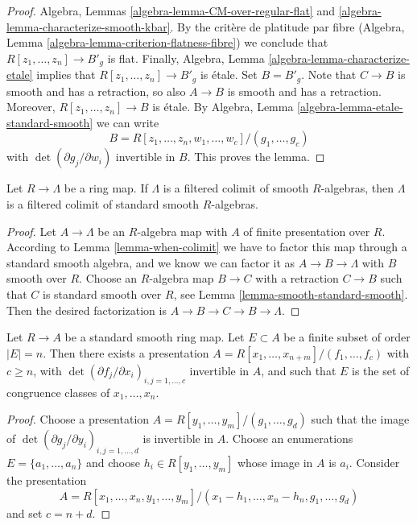 \begin{proof}
Algebra, Lemmas \ref{algebra-lemma-CM-over-regular-flat} and
\ref{algebra-lemma-characterize-smooth-kbar}. By the crit\`ere
de platitude par fibre
(Algebra, Lemma \ref{algebra-lemma-criterion-flatness-fibre})
we conclude that $R[z_1, \ldots, z_n] \to B'_g$ is flat.
Finally, Algebra, Lemma \ref{algebra-lemma-characterize-etale}
implies that $R[z_1, \ldots, z_n] \to B'_g$ is \'etale.
Set $B = B'_g$. Note that $C \to B$ is smooth and has a retraction,
so also $A \to B$ is smooth and has a retraction.
Moreover, $R[z_1, \ldots, z_n] \to B$ is \'etale.
By Algebra, Lemma \ref{algebra-lemma-etale-standard-smooth}
we can write
$$
B = R[z_1, \ldots, z_n, w_1, \ldots, w_c]/(g_1, \ldots, g_c)
$$
with $\det(\partial g_j/\partial w_i)$ invertible in $B$.
This proves the lemma.
\end{proof}

\begin{lemma}
\label{lemma-colimit-standard-smooth}
Let $R \to \Lambda$ be a ring map. If $\Lambda$ is a filtered colimit of
smooth $R$-algebras, then $\Lambda$ is a filtered colimit of standard
smooth $R$-algebras.
\end{lemma}

\begin{proof}
Let $A \to \Lambda$ be an $R$-algebra map with $A$
of finite presentation over $R$. According to
Lemma \ref{lemma-when-colimit}
we have to factor this map through a standard smooth algebra, and
we know we can factor it as $A \to B \to \Lambda$ with $B$ smooth
over $R$. Choose an $R$-algebra map $B \to C$ with a retraction
$C \to B$ such that $C$ is standard smooth over $R$, see
Lemma \ref{lemma-smooth-standard-smooth}.
Then the desired factorization is $A \to B \to C \to B \to \Lambda$.
\end{proof}

\begin{lemma}
\label{lemma-standard-smooth-include-generators}
Let $R \to A$ be a standard smooth ring map.
Let $E \subset A$ be a finite subset of order $|E| = n$.
Then there exists a presentation
$A = R[x_1, \ldots, x_{n + m}]/(f_1, \ldots, f_c)$ with $c \geq n$,
with $\det(\partial f_j/\partial x_i)_{i, j = 1, \ldots, c}$
invertible in $A$, and such that $E$ is the set of congruence classes of
$x_1, \ldots, x_n$.
\end{lemma}

\begin{proof}
Choose a presentation $A = R[y_1, \ldots, y_m]/(g_1, \ldots, g_d)$
such that the image of
$\det(\partial g_j/\partial y_i)_{i, j = 1, \ldots, d}$
is invertible in $A$. Choose an enumerations $E = \{a_1, \ldots, a_n\}$
and choose $h_i \in R[y_1, \ldots, y_m]$ whose image in $A$ is $a_i$.
Consider the presentation
$$
A = R[x_1, \ldots, x_n, y_1, \ldots, y_m]/
(x_1 - h_1, \ldots, x_n - h_n, g_1, \ldots, g_d)
$$
and set $c = n + d$.
\end{proof}

